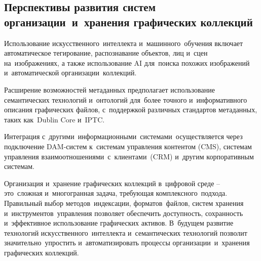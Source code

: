 \documentclass{ou}
\begin{document}
\subsection{Перспективы развития систем организации~и~хранения графических коллекций}
Использование искусственного~интеллекта и~машинного~обучения включает автоматическое тегирование, распознавание объектов, лиц и~сцен на~изображениях, а также использование AI для~поиска похожих изображений и~автоматической организации~коллекций.

Расширение возможностей метаданных предполагает использование семантических технологий и~онтологий для~более точного и~информативного описания графических файлов, с~поддержкой различных стандартов метаданных, таких как~Dublin Core и~IPTC.

Интеграция с~другими~информационными~системами~осуществляется через подключение DAM-систем к~системам управления контентом (CMS), системам управления взаимоотношениями~с~клиентами~(CRM) и~другим корпоративным системам.

Организация и~хранение графических коллекций в~цифровой среде -- это~сложная и~многогранная задача, требующая комплексного~подхода. Правильный выбор методов~индексации, форматов~файлов, систем хранения и~инструментов~управления позволяет обеспечить доступность, сохранность и~эффективное использование графических активов. В~будущем развитие технологий искусственного~интеллекта и~семантических технологий позволит значительно~упростить и~автоматизировать процессы организации~и~хранения графических коллекций.
\newpage
{
\sloppy
\nocite{*}


}
\end{document}
